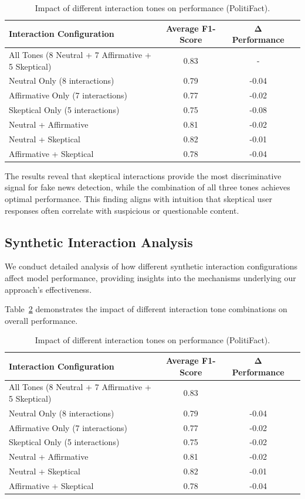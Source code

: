 \begin{table}[htbp]
\centering
\caption{Impact of different interaction tones on performance (PolitiFact).}
\label{tab:ablation_tones}
\begin{tabular}{lccc}
\toprule
\textbf{Interaction Configuration} & \textbf{Average F1-Score} & \textbf{Δ Performance} \\
\midrule
    All Tones (8 Neutral + 7 Affirmative + 5 Skeptical) & 0.83 & - \\
\midrule
Neutral Only (8 interactions) & 0.79 & -0.04 \\
Affirmative Only (7 interactions) & 0.77 & -0.02 \\
Skeptical Only (5 interactions) & 0.75 & -0.08 \\
\midrule
Neutral + Affirmative & 0.81 & -0.02 \\
Neutral + Skeptical & 0.82 & -0.01 \\
Affirmative + Skeptical & 0.78 & -0.04 \\
\bottomrule
\end{tabular}
\end{table}

The results reveal that skeptical interactions provide the most discriminative signal for fake news detection, while the combination of all three tones achieves optimal performance. This finding aligns with intuition that skeptical user responses often correlate with suspicious or questionable content.

\subsection{Synthetic Interaction Analysis}

We conduct detailed analysis of how different synthetic interaction configurations affect model performance, providing insights into the mechanisms underlying our approach's effectiveness.

Table~\ref{tab:hyperparameter_interaction_politifact} demonstrates the impact of different interaction tone combinations on overall performance.

\begin{table}[htbp]
\centering
\caption{Impact of different interaction tones on performance (PolitiFact).}
\label{tab:hyperparameter_interaction_politifact}
\begin{tabular}{lccc}
\toprule
\textbf{Interaction Configuration} & \textbf{Average F1-Score} & \textbf{Δ Performance} \\
\midrule
All Tones (8 Neutral + 7 Affirmative + 5 Skeptical) & 0.83 & \- \\
\midrule
Neutral Only (8 interactions) & 0.79 & -0.04 \\
Affirmative Only (7 interactions) & 0.77 & -0.02 \\
Skeptical Only (5 interactions) & 0.75 & -0.02 \\
\midrule
Neutral + Affirmative & 0.81 & -0.02 \\
Neutral + Skeptical & 0.82 & -0.01 \\
Affirmative + Skeptical & 0.78 & -0.04 \\
\bottomrule
\end{tabular}
\end{table}

